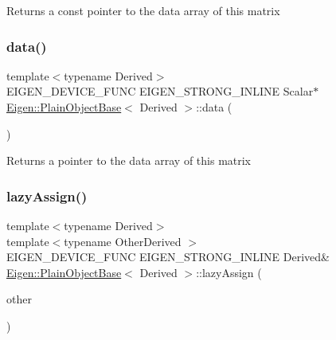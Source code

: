 \begin{DoxyReturn}{Returns}
a const pointer to the data array of this matrix 
\end{DoxyReturn}
\mbox{\label{class_eigen_1_1_plain_object_base_a54ed64f45b2f5e852355d5e2311810bd}} 
\subsubsection{\texorpdfstring{data()}{data()}\hspace{0.1cm}{\footnotesize\ttfamily [2/2]}}
{\footnotesize\ttfamily template$<$typename Derived$>$ \\
E\+I\+G\+E\+N\+\_\+\+D\+E\+V\+I\+C\+E\+\_\+\+F\+U\+NC E\+I\+G\+E\+N\+\_\+\+S\+T\+R\+O\+N\+G\+\_\+\+I\+N\+L\+I\+NE Scalar$\ast$ \mbox{\hyperlink{class_eigen_1_1_plain_object_base}{Eigen\+::\+Plain\+Object\+Base}}$<$ Derived $>$\+::data (\begin{DoxyParamCaption}{ }\end{DoxyParamCaption})\hspace{0.3cm}{\ttfamily [inline]}}

\begin{DoxyReturn}{Returns}
a pointer to the data array of this matrix 
\end{DoxyReturn}
\mbox{\label{class_eigen_1_1_plain_object_base_a6008cee3b716d514b3e14c1bc7c0d34a}} 
\subsubsection{\texorpdfstring{lazyAssign()}{lazyAssign()}}
{\footnotesize\ttfamily template$<$typename Derived$>$ \\
template$<$typename Other\+Derived $>$ \\
E\+I\+G\+E\+N\+\_\+\+D\+E\+V\+I\+C\+E\+\_\+\+F\+U\+NC E\+I\+G\+E\+N\+\_\+\+S\+T\+R\+O\+N\+G\+\_\+\+I\+N\+L\+I\+NE Derived\& \mbox{\hyperlink{class_eigen_1_1_plain_object_base}{Eigen\+::\+Plain\+Object\+Base}}$<$ Derived $>$\+::lazy\+Assign (\begin{DoxyParamCaption}\item[{const \mbox{\hyperlink{class_eigen_1_1_dense_base}{Dense\+Base}}$<$ Other\+Derived $>$ \&}]{other }\end{DoxyParamCaption})\hspace{0.3cm}{\ttfamily [inline]}}

